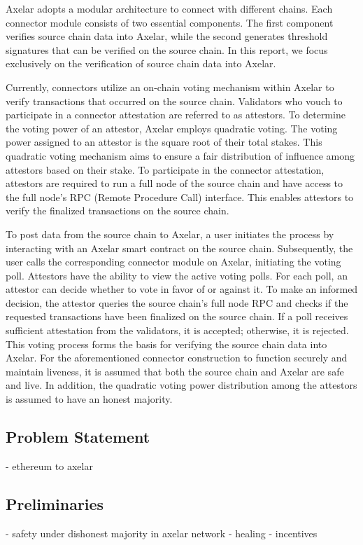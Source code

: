 Axelar adopts a modular architecture to connect with different chains. Each connector module consists of two essential components. The first component verifies source chain data into Axelar, while the second generates threshold signatures that can be verified on the source chain. In this report, we focus exclusively on the verification of source chain data into Axelar.

Currently, connectors utilize an on-chain voting mechanism within Axelar to verify transactions that occurred on the source chain. Validators who vouch to participate in a connector attestation are referred to as attestors. To determine the voting power of an attestor, Axelar employs quadratic voting. The voting power assigned to an attestor is the square root of their total stakes. This quadratic voting mechanism aims to ensure a fair distribution of influence among attestors based on their stake. To participate in the connector attestation, attestors are required to run a full node of the source chain and have access to the full node's RPC (Remote Procedure Call) interface. This enables attestors to verify the finalized transactions on the source chain.

To post data from the source chain to Axelar, a user initiates the process by interacting with an Axelar smart contract on the source chain. Subsequently, the user calls the corresponding connector module on Axelar, initiating the voting poll. Attestors have the ability to view the active voting polls. For each poll, an attestor can decide whether to vote in favor of or against it. To make an informed decision, the attestor queries the source chain's full node RPC and checks if the requested
transactions have been finalized on the source chain. If a poll receives sufficient attestation from the validators, it is accepted; otherwise, it is rejected. This voting process forms the basis for verifying the source chain data into Axelar. 
For the aforementioned connector construction to function securely and maintain liveness, it is assumed that both the source chain and Axelar are safe and live. In addition, the quadratic voting power distribution among the attestors is assumed to have an honest majority.
\subsection{Problem Statement}
- ethereum to axelar
\subsection{Preliminaries}
- safety under dishonest majority in axelar network
- healing 
- incentives 
